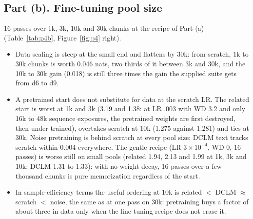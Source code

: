 \subsection*{Part (b). Fine-tuning pool size}

 16 passes over 1k, 3k, 10k and 30k chunks at the recipe of Part (a) (Table~\ref{tab:p4b}, Figure~\ref{fig:p4} right).
\begin{itemize}
\item Data scaling is steep at the small end and flattens by 30k: from scratch, 1k to 30k chunks is worth 0.046 nats, two thirds of it between 3k and 30k, and the 10k to 30k gain (0.018) is still three times the gain the supplied suite gets from d6 to d9.
\item A pretrained start does not substitute for data at the scratch LR. The related start is worst at 1k and 3k (3.19 and 1.38: at LR .003 with WD 3.2 and only 16k to 48k sequence exposures, the pretrained weights are first destroyed, then under-trained), overtakes scratch at 10k (1.275 against 1.281) and ties at 30k. Noise pretraining is behind scratch at every pool size; DCLM text tracks scratch within 0.004 everywhere. The gentle recipe (LR $3\times10^{-4}$, WD 0, 16 passes) is worse still on small pools (related 1.94, 2.13 and 1.99 at 1k, 3k and 10k; DCLM 1.31 to 1.33): with no weight decay, 16 passes over a few thousand chunks is pure memorization regardless of the start.
\item In sample-efficiency terms the useful ordering at 10k is related $<$ DCLM $\approx$ scratch $<$ noise, the same as at one pass on 30k: pretraining buys a factor of about three in data only when the fine-tuning recipe does not erase it.
\end{itemize}
